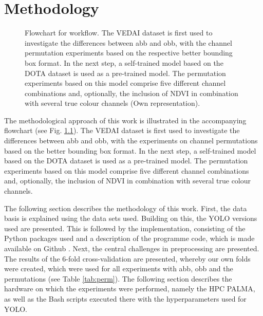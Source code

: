 \chapter{Methodology}
\label{ch:methodology}
\begin{figure}[htbp]
    \centering
    
    \caption[Flowchart for workflow]{Flowchart for workflow. The VEDAI dataset is first used to investigate the differences between \acrshort{abb} and \acrshort{obb}, with the channel permutation experiments based on the respective better bounding box format. In the next step, a self-trained model based on the DOTA dataset is used as a pre-trained model. The permutation experiments based on this model comprise five different channel combinations and, optionally, the inclusion of NDVI in combination with several true colour channels (Own representation).}
    \label{fig:Flowchart}
\end{figure}

The methodological approach of this work is illustrated in the accompanying flowchart (see Fig. \ref{fig:Flowchart}). The \acrshort{VEDAI} dataset is first used to investigate the differences between \acrshort{abb} and \acrshort{obb}, with the experiments on channel permutations based on the better bounding box format. In the next step, a self-trained model based on the DOTA dataset is used as a pre-trained model. The permutation experiments based on this model comprise five different channel combinations and, optionally, the inclusion of NDVI in combination with several true colour channels.

The following section describes the methodology of this work. First, the data basis is explained using the data sets used. Building on this, the \acrshort{YOLO} versions used are presented. This is followed by the implementation, consisting of the Python packages used and a description of the programme code, which is made available on Github \cite{Github_timo}. Next, the central challenges in preprocessing are presented. The results of the 6-fold cross-validation are presented, whereby our own folds were created, which were used for all experiments with \acrshort{abb}, \acrshort{obb} and the permutations (see Table \ref{tab:perm}). The following section describes the hardware on which the experiments were performed, namely the \acrlong{HPC} \acrshort{PALMA}, as well as the Bash scripts executed there with the hyperparameters used for \acrshort{YOLO}.



